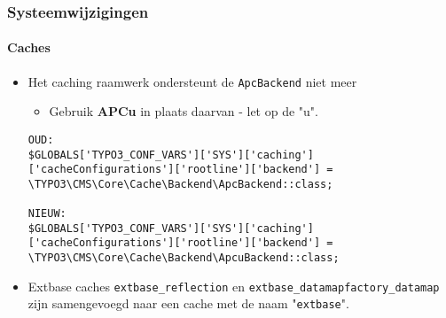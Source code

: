 \begin{frame}[fragile]
	\frametitle{Systeemwijzigingen}
	\framesubtitle{Caches}

	\lstset{basicstyle=\tiny\ttfamily}

	\begin{itemize}
		\item Het caching raamwerk ondersteunt de \texttt{ApcBackend} niet meer

			\begin{itemize}\smaller
				\item[\ding{228}] Gebruik \textbf{APCu} in plaats daarvan - let op de "u".
			\end{itemize}
\begin{lstlisting}
OUD:
$GLOBALS['TYPO3_CONF_VARS']['SYS']['caching']['cacheConfigurations']['rootline']['backend'] =
\TYPO3\CMS\Core\Cache\Backend\ApcBackend::class;

NIEUW:
$GLOBALS['TYPO3_CONF_VARS']['SYS']['caching']['cacheConfigurations']['rootline']['backend'] =
\TYPO3\CMS\Core\Cache\Backend\ApcuBackend::class;
\end{lstlisting}

		\item Extbase caches \texttt{extbase\_reflection} en \texttt{extbase\_datamapfactory\_datamap}
			zijn samengevoegd naar een cache met de naam "\texttt{extbase}".

	\end{itemize}

\end{frame}


